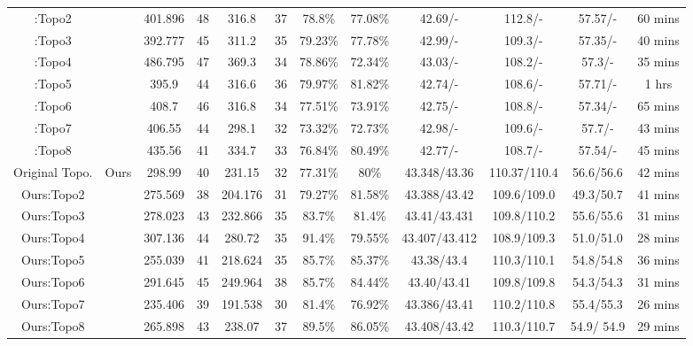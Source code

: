 \begin{table}
\begin{center}
\begin{tabular}{|c|c|c|c|c|c|c|c|c|c|c|c|}
              \cite{ALP_YPWeng_iccad2011}:Topo2 & & 401.896 & 48 & 316.8 & 37 & 78.8\% & 77.08\% & 42.69/- & 112.8/- & 57.57/- & 60 mins \\
              \cite{ALP_YPWeng_iccad2011}:Topo3 & & 392.777 & 45 & 311.2 & 35 & 79.23\% & 77.78\% & 42.99/- & 109.3/- & 57.35/- & 40 mins \\
              \cite{ALP_YPWeng_iccad2011}:Topo4 & & 486.795 & 47 & 369.3 & 34 & 78.86\% & 72.34\% & 43.03/- & 108.2/- & 57.3/- & 35 mins \\
              \cite{ALP_YPWeng_iccad2011}:Topo5 & & 395.9 & 44 & 316.6 & 36 & 79.97\% & 81.82\% & 42.74/- & 108.6/- & 57.71/- & 1 hrs \\
              \cite{ALP_YPWeng_iccad2011}:Topo6 & & 408.7 & 46 & 316.8 & 34 & 77.51\% & 73.91\% & 42.75/- & 108.8/- & 57.34/- & 65 mins\\
              \cite{ALP_YPWeng_iccad2011}:Topo7 & & 406.55 & 44 & 298.1 & 32 & 73.32\% & 72.73\% & 42.98/- & 109.6/- & 57.7/- & 43 mins \\
              \cite{ALP_YPWeng_iccad2011}:Topo8 & & 435.56 & 41 & 334.7 & 33 & 76.84\% & 80.49\% & 42.77/- & 108.7/- & 57.54/- & 45 mins \\
            \hline
              Original Topo. & \multirow{8}{*}{Ours} & 298.99 & 40 & 231.15 & 32 & 77.31\% & 80\% & 43.348/43.36 & 110.37/110.4 & 56.6/56.6 & 42 mins \\ \cline{1-1} \cline{3-12}
              Ours:Topo2 & & 275.569 & 38 & 204.176 & 31 & 79.27\% & 81.58\% & 43.388/43.42 & 109.6/109.0 & 49.3/50.7  &  41 mins \\
              Ours:Topo3 & & 278.023 & 43 & 232.866 & 35 & 83.7\% & 81.4\% &  43.41/43.431 & 109.8/110.2 & 55.6/55.6 & 31 mins \\
              Ours:Topo4 & & 307.136 & 44 & 280.72 & 35 & 91.4\% & 79.55\% & 43.407/43.412 & 108.9/109.3 & 51.0/51.0 &  28 mins \\
              Ours:Topo5 & & 255.039 & 41 & 218.624 & 35 & 85.7\% & 85.37\% & 43.38/43.4&  110.3/110.1 & 54.8/54.8 & 36 mins \\
              Ours:Topo6 & & 291.645 & 45 & 249.964 & 38 & 85.7\% & 84.44\% &  43.40/43.41 &  109.8/109.8 & 54.3/54.3 & 31 mins \\
              Ours:Topo7 & & 235.406 & 39 & 191.538 & 30 & 81.4\% & 76.92\% &  43.386/43.41&  110.2/110.8 &  55.4/55.3 &  26 mins \\
              Ours:Topo8 & & 265.898 & 43 & 238.07 & 37 & 89.5\% & 86.05\% &  43.408/43.42 &  110.3/110.7 & 54.9/ 54.9 &  29 mins \\

\end{tabular}
\end{center}
\end{table}
